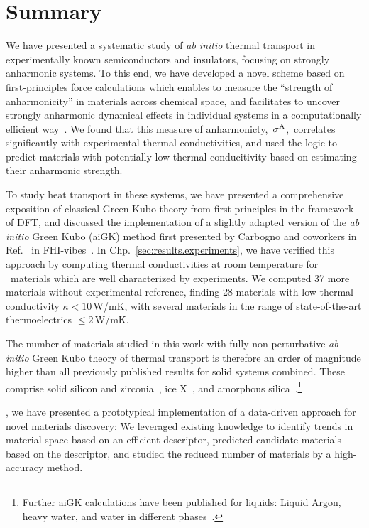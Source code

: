 \section{Summary}

We have presented a systematic study of \emph{ab initio} thermal transport in experimentally known semiconductors and insulators, focusing on strongly anharmonic systems. To this end, we have developed a novel scheme based on first-principles force calculations which enables to measure the ``strength of anharmonicity'' in materials across chemical space, and facilitates to uncover strongly anharmonic dynamical effects in individual systems in a computationally efficient way~\cite{Knoop2020}. We found that this measure of anharmonicty,~$\sigma^\mathrm{A}$,~correlates significantly with experimental thermal conductivities, and used the logic to predict materials with potentially low thermal conducitivity based on estimating their anharmonic strength.

To study heat transport in these systems, we have presented a comprehensive exposition of classical Green-Kubo theory from first principles in the framework of DFT, and discussed the implementation of a slightly adapted version of the \emph{ab initio} Green Kubo (aiGK) method first presented by Carbogno and coworkers in Ref.~\cite{Carbogno2016} in FHI-vibes~\cite{FHI-vibes}. In Chp.~\ref{sec:results.experiments}, we have verified this approach by computing thermal conductivities at room temperature for ~materials which are well characterized by experiments. We computed  37 more materials without experimental reference, finding  28 materials with low thermal conductivity $\kappa < 10$\,W/mK, with several materials in the range of state-of-the-art thermoelectrics $\leq 2$\,W/mK. 

The number of materials studied in this work with fully non-perturbative \emph{ab initio} Green Kubo theory of thermal transport is therefore an order of magnitude higher than all previously published results for solid systems combined. These comprise solid silicon and zirconia~\cite{Carbogno2016}, ice X~\cite{Grasselli2020}, and amorphous silica~\cite{Marcolongo2020}.\footnote{Further aiGK calculations have been published for liquids: Liquid Argon, heavy water, and water in different phases~\cite{Marcolongo2016,Marcolongo2020,Grasselli2020}.}

, we have presented a prototypical implementation of a data-driven approach for novel materials discovery: We leveraged existing knowledge to identify trends in material space based on an efficient descriptor, predicted candidate materials based on the descriptor, and studied the reduced number of materials by a high-accuracy method.

